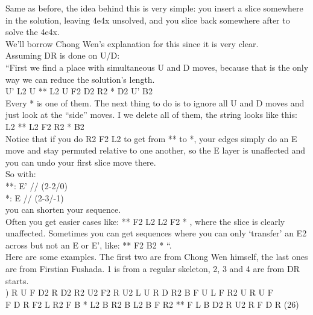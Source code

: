 \documentclass[11pt,a4paper]{book}
\newcommand{\p}{\textquotesingle}
\newcommand{\ps}{\p\,\,}
\begin{document}
Same as before, the idea behind this is very simple: you insert a slice somewhere in the solution, leaving 4e4x unsolved, and you slice back somewhere after to solve the 4e4x. \\
We’ll borrow Chong Wen’s explanation for this since it is very clear.\\
\newline
Assuming DR is done on U/D:\\
“First we find a place with simultaneous U and D moves, because that is the only way we can reduce the solution’s length.\\
\newline
U’ L2 U ** L2 U F2 D2 R2 * D2 U’ B2\\
\newline
Every * is one of them. The next thing to do is to ignore all U and D moves and just look at the “side” moves. I we delete all of them, the string looks like this:\\
\newline
L2 ** L2 F2 R2 * B2\\
\newline
Notice that if you do R2 F2 L2 to get from ** to *, your edges simply do an E move and stay permuted relative to one another, so the E layer is unaffected and you can undo your first slice move there.\\
\newpage
\hfill \break
So with: \\
**: E' // (2-2/0)\\
*: E // (2-3/-1)\\
you can shorten your sequence.\\
\newline
Often you get easier cases like: ** F2 L2 L2 F2 * , where the slice is clearly unaffected. Sometimes you can get sequences where you can only ‘transfer’ an E2 across but not an E or E’, like: ** F2 B2 * “.\\
\newline
Here are some examples. The first two are from Chong Wen himself, the last ones are from Firstian Fushada. 1 is from a regular skeleton, 2, 3 and 4 are from DR starts.\\
) R\ps U\ps F D2 R\ps D2 R2 U2 F2 R\ps U2 L\ps U\ps R\ps D\ps R2 B\ps F\ps U\ps L\ps F\ps R2 U R\ps U\ps F\\
\newline
F\ps D\ps R\ps F2 L R2 F\ps B\ps * L2 B R2 B\ps L2 B F R2 ** F\ps L B\ps D2 R\ps U2 R\ps F D R\ps (26)\\
\end{document}
